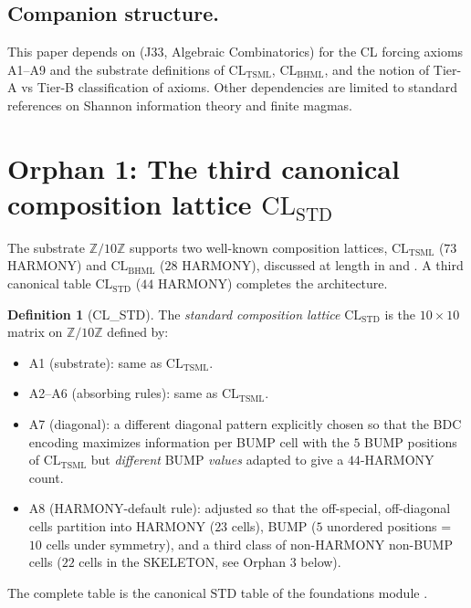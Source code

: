 \documentclass[11pt,reqno]{amsart}
\theoremstyle{plain}
\theoremstyle{definition}
\newtheorem{definition}[theorem]{Definition}
\theoremstyle{remark}
\newcommand{\Z}{\mathbb{Z}}
\newcommand{\TSML}{\mathrm{TSML}}
\newcommand{\BHML}{\mathrm{BHML}}
\newcommand{\STD}{\mathrm{STD}}
\begin{document}
\subsection{Companion structure.}
This paper depends on \cite{SandersForcing} (J33, Algebraic
Combinatorics) for the CL forcing axioms A1--A9 and the substrate
definitions of $\mathrm{CL}_\TSML$, $\mathrm{CL}_\BHML$, and the
notion of Tier-A vs Tier-B classification of axioms. Other
dependencies are limited to standard references on Shannon
information theory and finite magmas.

\section{Orphan 1: The third canonical composition lattice $\mathrm{CL}_\STD$}
\label{sec:std}

The substrate $\Z/10\Z$ supports two well-known composition lattices,
$\mathrm{CL}_\TSML$ ($73$ HARMONY) and $\mathrm{CL}_\BHML$ ($28$
HARMONY), discussed at length in \cite{SandersForcing} and
\cite{SandersGishThreeSubstrate}.
A third canonical table $\mathrm{CL}_\STD$ ($44$ HARMONY) completes
the architecture.

\begin{definition}[CL\_STD]\label{def:std}
The \emph{standard composition lattice} $\mathrm{CL}_\STD$ is the
$10 \times 10$ matrix on $\Z/10\Z$ defined by:
\begin{itemize}
\item A1 (substrate): same as $\mathrm{CL}_\TSML$.
\item A2--A6 (absorbing rules): same as $\mathrm{CL}_\TSML$.
\item A7 (diagonal): a different diagonal pattern explicitly chosen so
that the BDC encoding maximizes information per BUMP cell with the
$5$ BUMP positions of $\mathrm{CL}_\TSML$ but \emph{different} BUMP
\emph{values} adapted to give a $44$-HARMONY count.
\item A8 (HARMONY-default rule): adjusted so that the off-special,
off-diagonal cells partition into HARMONY ($23$ cells), BUMP ($5$
unordered positions = $10$ cells under symmetry), and a third class of
non-HARMONY non-BUMP cells ($22$ cells in the SKELETON, see
Orphan 3 below).
\end{itemize}
The complete table is the canonical $\STD$ table of the foundations
module \cite{LensCatalog}.
\end{definition}
\end{document}
